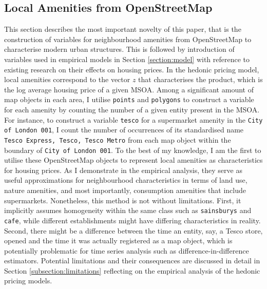 \documentclass{article}
\begin{document}
\subsection{Local Amenities from OpenStreetMap} \label{subsection:variable}
This section describes the most important novelty of this paper, that is the construction of variables for neighbourhood amenities from OpenStreetMap to characterise modern urban structures. This is followed by introduction of variables used in empirical models in Section \ref{section:model} with reference to existing research on their effects on housing prices. In the hedonic pricing model, local amenities correspond to the vector $z$ that characterises the product, which is the log average housing price of a given MSOA. Among a significant amount of map objects in each area, I utilise \texttt{points} and \texttt{polygons} to construct a variable for each amenity by counting the number of a given entity present in the MSOA. For instance, to construct a variable \texttt{tesco} for a supermarket amenity in the \texttt{City of London 001}, I count the number of occurrences of its standardised name \texttt{Tesco Express, Tesco, Tesco Metro} from each map object within the boundary of \texttt{City of London 001}. To the best of my knowledge, I am the first to utilise these OpenStreetMap objects to represent local amenities as characteristics for housing prices. As I demonstrate in the empirical analysis, they serve as useful approximations for neighbourhood characteristics in terms of land use, nature amenities, and most importantly, consumption amenities that include supermarkets. Nonetheless, this method is not without limitations. First, it implicitly assumes homogeneity within the same class such as \texttt{sainsburys} and \texttt{cafe}, while different establishments might have differing characteristics in reality. Second, there might be a difference between the time an entity, say, a Tesco store, opened and the time it was actually registered as a map object, which is potentially problematic for time series analysis such as difference-in-difference estimators. Potential limitations and their consequences are discussed in detail in Section \ref{subsection:limitations} reflecting on the empirical analysis of the hedonic pricing models. 
\end{document}
